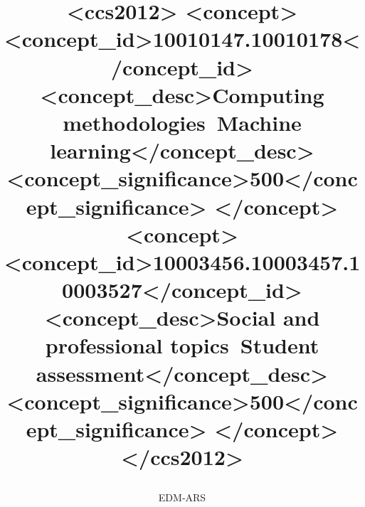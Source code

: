 \documentclass[sigconf]{acmart}
\begin{document}
\title{%

\author{EDM-ARS}
\email{}



\renewcommand{\shortauthors}{EDMARS.AI}

\begin{abstract}
\end{abstract}

\begin{CCSXML}
<ccs2012>
 <concept>
  <concept_id>10010147.10010178</concept_id>
  <concept_desc>Computing methodologies~Machine learning</concept_desc>
  <concept_significance>500</concept_significance>
 </concept>
 <concept>
  <concept_id>10003456.10003457.10003527</concept_id>
  <concept_desc>Social and professional topics~Student assessment</concept_desc>
  <concept_significance>500</concept_significance>
 </concept>
</ccs2012>
\end{CCSXML}


\keywords{%

\maketitle


\section{Introduction}

\section{Related Work}

}}
\end{document}
